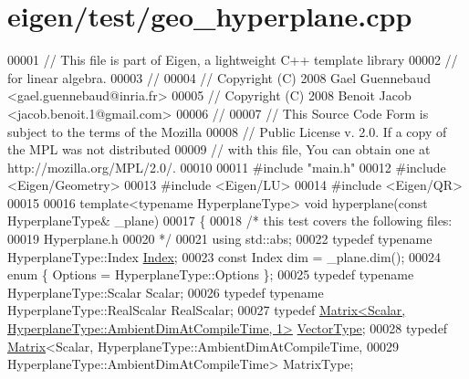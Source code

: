 \hypertarget{eigen_2test_2geo__hyperplane_8cpp_source}{}\section{eigen/test/geo\+\_\+hyperplane.cpp}
\label{eigen_2test_2geo__hyperplane_8cpp_source}

\begin{DoxyCode}
00001 \textcolor{comment}{// This file is part of Eigen, a lightweight C++ template library}
00002 \textcolor{comment}{// for linear algebra.}
00003 \textcolor{comment}{//}
00004 \textcolor{comment}{// Copyright (C) 2008 Gael Guennebaud <gael.guennebaud@inria.fr>}
00005 \textcolor{comment}{// Copyright (C) 2008 Benoit Jacob <jacob.benoit.1@gmail.com>}
00006 \textcolor{comment}{//}
00007 \textcolor{comment}{// This Source Code Form is subject to the terms of the Mozilla}
00008 \textcolor{comment}{// Public License v. 2.0. If a copy of the MPL was not distributed}
00009 \textcolor{comment}{// with this file, You can obtain one at http://mozilla.org/MPL/2.0/.}
00010 
00011 \textcolor{preprocessor}{#include "main.h"}
00012 \textcolor{preprocessor}{#include <Eigen/Geometry>}
00013 \textcolor{preprocessor}{#include <Eigen/LU>}
00014 \textcolor{preprocessor}{#include <Eigen/QR>}
00015 
00016 \textcolor{keyword}{template}<\textcolor{keyword}{typename} HyperplaneType> \textcolor{keywordtype}{void} hyperplane(\textcolor{keyword}{const} HyperplaneType& \_plane)
00017 \{
00018   \textcolor{comment}{/* this test covers the following files:}
00019 \textcolor{comment}{     Hyperplane.h}
00020 \textcolor{comment}{  */}
00021   \textcolor{keyword}{using} std::abs;
00022   \textcolor{keyword}{typedef} \textcolor{keyword}{typename} HyperplaneType::Index \hyperlink{namespace_eigen_a62e77e0933482dafde8fe197d9a2cfde}{Index};
00023   \textcolor{keyword}{const} Index dim = \_plane.dim();
00024   \textcolor{keyword}{enum} \{ Options = HyperplaneType::Options \};
00025   \textcolor{keyword}{typedef} \textcolor{keyword}{typename} HyperplaneType::Scalar Scalar;
00026   \textcolor{keyword}{typedef} \textcolor{keyword}{typename} HyperplaneType::RealScalar RealScalar;
00027   \textcolor{keyword}{typedef} \hyperlink{group___core___module_class_eigen_1_1_matrix}{Matrix<Scalar, HyperplaneType::AmbientDimAtCompileTime, 1>}
       \hyperlink{struct_vector_type}{VectorType};
00028   \textcolor{keyword}{typedef} \hyperlink{group___core___module_class_eigen_1_1_matrix}{Matrix}<Scalar, HyperplaneType::AmbientDimAtCompileTime,
00029                          HyperplaneType::AmbientDimAtCompileTime> MatrixType;

\end{DoxyCode}
